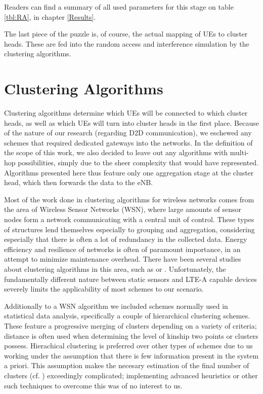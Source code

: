Readers can find a summary of all used parameters for this stage on table \ref{tbl:RA}, in chapter \ref{Results}.

The last piece of the puzzle is, of course, the actual mapping of UEs to cluster heads. These are fed into the random access and interference simulation by the clustering algorithms.

\section{Clustering Algorithms} \label{ClusteringAlgs}
Clustering algorithms determine which UEs will be connected to which cluster heads, as well as which UEs will turn into cluster heads in the first place. Because of the nature of our research (regarding D2D communication), we eschewed any schemes that required dedicated gateways into the networks. In the definition of the scope of this work, we also decided to leave out any algorithms with multi-hop possibilities, simply due to the sheer complexity that would have represented. Algorithms presented here thus feature only one aggregation stage at the cluster head, which then forwards the data to the eNB.

Most of the work done in clustering algorithms for wireless networks comes from the area of Wireless Sensor Networks (WSN), where large amounts of sensor nodes form a network communicating with a central unit of control. These types of structures lend themselves especially to grouping and aggregation, considering especially that there is often a lot of redundancy in the collected data. Energy efficiency and resilience of networks is often of paramount importance, in an attempt to minimize maintenance overhead. There have been several studies about clustering algorithms in this area, such as \cite{Jiang2009} or \cite{Afsar2014}. Unfortunately, the fundamentally different nature between static sensors and LTE-A capable devices severely limits the applicability of most schemes to our scenario.

Additionally to a WSN algorithm we included schemes normally used in statistical data analysis, specifically a couple of hierarchical clustering schemes. These feature a progressive merging of clusters depending on a variety of criteria; distance is often used when determining the level of kinship two points or clusters possess. Hierachical clustering is preferred over other types of schemes due to us working under the assumption that there is few information present in the system a priori. This assumption makes the necesary estimation of the final number of clusters (cf. \cite{Everitt2011}) exceedingly complicated; implementing advanced heuristics or other such techniques to overcome this was of no interest to us.

